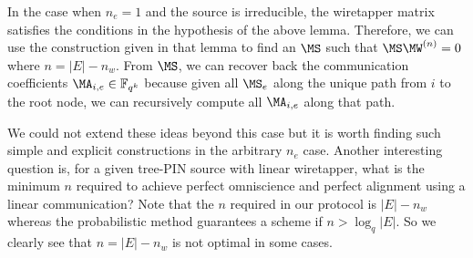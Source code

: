  In the case when $n_e=1$ and the source is irreducible, the wiretapper matrix satisfies the conditions in the hypothesis of the above lemma. Therefore, we can use the construction given in that lemma to find an $\MS$  such that $\MS\MW^{(n)}=0$ where $n = |E|-n_w$. From $\MS$, we can recover back the communication coefficients $\MA_{i,e} \in \mathbb{F}_{q^k}$ because  given all $\MS_e$ along the unique path from $i$ to the root node, we can recursively compute all $\MA_{i,e}$ along that path. 
 
 We could not extend these ideas beyond this case but it is worth finding such simple and explicit constructions in the arbitrary $n_e$ case. Another interesting question is, for a given tree-PIN source with linear wiretapper, what is the minimum $n$ required to achieve perfect omniscience and perfect alignment using a linear communication? Note that the $n$ required in our protocol is $|E|-n_w$ whereas the  probabilistic method guarantees a scheme if $n > \log_q|E|$. So we clearly see that  $n = |E|-n_w$  is not optimal in some cases. 
 